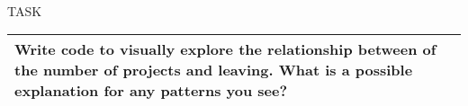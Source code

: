 \documentclass[11pt]{article}
\begin{document}
    
    
    \begin{center}
    \end{center}
    { \hspace*{\fill} \\}
    
    \textbar{}

TASK

\begin{longtable}[]{@{}l@{}}
\toprule
\begin{minipage}[t]{0.07\columnwidth}\raggedright\strut
Write code to visually explore the relationship between of the number of
projects and leaving. What is a possible explanation for any patterns
you see?\strut
\end{minipage}\tabularnewline
\bottomrule
\end{longtable}
\end{document}
